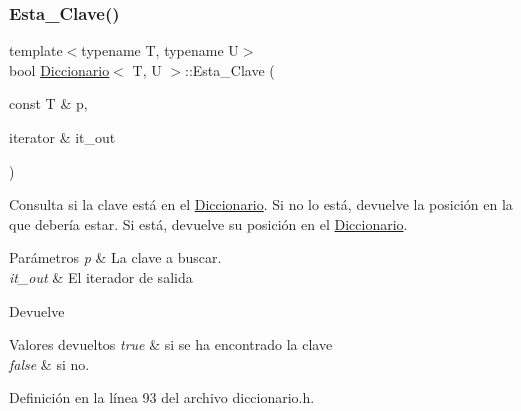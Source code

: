 \subsubsection{\texorpdfstring{Esta\+\_\+\+Clave()}{Esta\_Clave()}}
{\footnotesize\ttfamily template$<$typename T, typename U$>$ \\
bool \hyperlink{classDiccionario}{Diccionario}$<$ T, U $>$\+::Esta\+\_\+\+Clave (\begin{DoxyParamCaption}\item[{const T \&}]{p,  }\item[{iterator \&}]{it\+\_\+out }\end{DoxyParamCaption})\hspace{0.3cm}{\ttfamily [inline]}}



Consulta si la clave está en el \hyperlink{classDiccionario}{Diccionario}. Si no lo está, devuelve la posición en la que debería estar. Si está, devuelve su posición en el \hyperlink{classDiccionario}{Diccionario}. 


\begin{DoxyParams}{Parámetros}
{\em p} & La clave a buscar. \\
\hline
{\em it\+\_\+out} & El iterador de salida \\
\hline
\end{DoxyParams}
\begin{DoxyReturn}{Devuelve}

\end{DoxyReturn}

\begin{DoxyRetVals}{Valores devueltos}
{\em true} & si se ha encontrado la clave \\
\hline
{\em false} & si no. \\
\hline
\end{DoxyRetVals}


Definición en la línea 93 del archivo diccionario.\+h.


